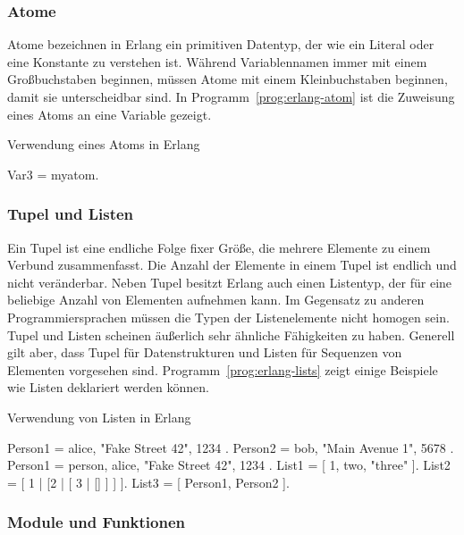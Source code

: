 \subsubsection{Atome}

Atome bezeichnen in Erlang ein primitiven Datentyp, der wie ein Literal oder eine Konstante zu verstehen ist. Während Variablennamen immer mit einem Großbuchstaben beginnen, müssen Atome mit einem Kleinbuchstaben beginnen, damit sie unterscheidbar sind. In Programm~\ref{prog:erlang-atom} ist die Zuweisung eines Atoms an eine Variable gezeigt.

\begin{program}[!hbt]
\caption{Verwendung eines Atoms in Erlang}
\label{prog:erlang-atom}
\begin{ErlangCode}
Var3 = myatom.
\end{ErlangCode}
\end{program}

\subsubsection{Tupel und Listen}

Ein Tupel ist eine endliche Folge fixer Größe, die mehrere Elemente zu einem Verbund zusammenfasst. Die Anzahl der Elemente in einem Tupel ist endlich und nicht veränderbar. Neben Tupel besitzt Erlang auch einen Listentyp, der für eine beliebige Anzahl von Elementen aufnehmen kann. Im Gegensatz zu anderen Programmiersprachen müssen die Typen der Listenelemente nicht homogen sein. Tupel und Listen scheinen äußerlich sehr ähnliche Fähigkeiten zu haben. Generell gilt aber, dass Tupel für Datenstrukturen und Listen für Sequenzen von Elementen vorgesehen sind. Programm~\ref{prog:erlang-lists} zeigt einige Beispiele wie Listen deklariert werden können.

\begin{program}[!hbt]
\caption{Verwendung von Listen in Erlang}
\label{prog:erlang-lists}
\begin{ErlangCode}
Person1 = { alice, "Fake Street 42", 1234 }.
Person2 = { bob, "Main Avenue 1", 5678 }.
Person1 = { person, alice, "Fake Street 42", 1234 }. %
List1 = [ 1, two, "three" ].
List2 = [ 1 | [2 | [ 3 | [] ] ] ].
List3 = [ Person1, Person2 ].
\end{ErlangCode}
\end{program}

\subsubsection{Module und Funktionen}

